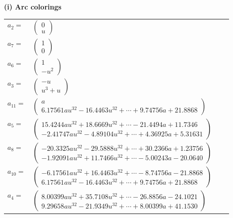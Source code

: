 \documentclass[1p]{elsarticle_modified}
\theoremstyle{definition}
\begin{document}
\flushleft \textbf{(i) Arc colorings}\\
\begin{tabular}{m{7pt} m{180pt} m{7pt} m{180pt} }
\flushright $a_{2}=$&$\begin{pmatrix}0\\u\end{pmatrix}$ \\
\flushright $a_{7}=$&$\begin{pmatrix}1\\0\end{pmatrix}$ \\
\flushright $a_{6}=$&$\begin{pmatrix}1\\- u^2\end{pmatrix}$ \\
\flushright $a_{3}=$&$\begin{pmatrix}- u\\u^3+u\end{pmatrix}$ \\
\flushright $a_{11}=$&$\begin{pmatrix}a\\6.17561 a u^{32}-16.4463 u^{32}+\cdots+9.74756 a+21.8868\end{pmatrix}$ \\
\flushright $a_{5}=$&$\begin{pmatrix}15.4244 a u^{32}+18.6669 u^{32}+\cdots-21.4494 a+11.7346\\-2.41747 a u^{32}-4.89104 u^{32}+\cdots+4.36925 a+5.31631\end{pmatrix}$ \\
\flushright $a_{8}=$&$\begin{pmatrix}-20.3325 a u^{32}-29.5888 u^{32}+\cdots+30.2366 a+1.23756\\-1.92091 a u^{32}+11.7466 u^{32}+\cdots-5.00243 a-20.0640\end{pmatrix}$ \\
\flushright $a_{10}=$&$\begin{pmatrix}-6.17561 a u^{32}+16.4463 u^{32}+\cdots-8.74756 a-21.8868\\6.17561 a u^{32}-16.4463 u^{32}+\cdots+9.74756 a+21.8868\end{pmatrix}$ \\
\flushright $a_{4}=$&$\begin{pmatrix}8.00399 a u^{32}+35.7108 u^{32}+\cdots-26.8856 a-24.1021\\9.29658 a u^{32}-21.9349 u^{32}+\cdots+8.00399 a+41.1530\end{pmatrix}$ \\

\end{tabular}
\end{document}

